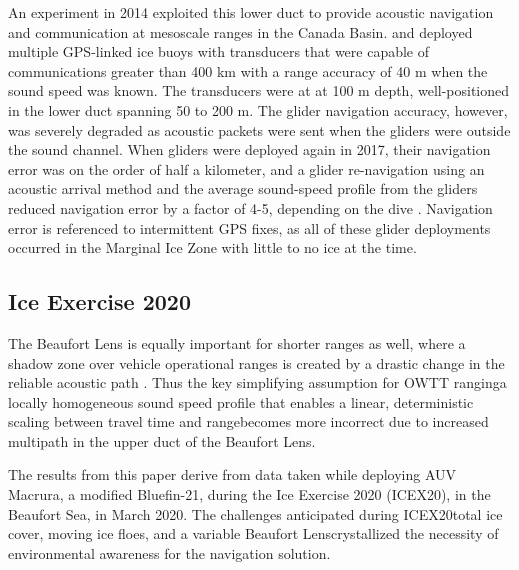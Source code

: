 An experiment in 2014 exploited this lower duct to provide acoustic navigation and communication at mesoscale ranges in the Canada Basin.
\citet{freitag_long_2015} and \citet{webster_towards_2015} deployed multiple GPS-linked ice buoys with transducers that were capable of communications greater than 400 km with a range accuracy of 40 m when the sound speed was known.
The transducers were at at 100 m depth, well-positioned in the lower duct spanning 50 to 200 m.
The glider navigation accuracy, however, was severely degraded as acoustic packets were sent when the gliders were outside the sound channel.
When gliders were deployed again in 2017, their navigation error was on the order of half a kilometer, and a glider re-navigation using an acoustic arrival method and the average sound-speed profile from the gliders reduced navigation error by a factor of 4-5, depending on the dive \citep{graupe_preliminary_2019}.
Navigation error is referenced to intermittent GPS fixes, as all of these glider deployments occurred in the Marginal Ice Zone with little to no ice at the time.

\subsection{Ice Exercise 2020}

The Beaufort Lens is equally important for shorter ranges as well, where a shadow zone over vehicle operational ranges is created by a drastic change in the reliable acoustic path \citep{schmidt_acoustic_2016}.
Thus the key simplifying assumption for OWTT ranging\textemdash a locally homogeneous sound speed profile that enables a linear, deterministic scaling between travel time and range\textemdash becomes more incorrect due to increased multipath in the upper duct of the Beaufort Lens.

The results from this paper derive from data taken while deploying AUV Macrura, a modified Bluefin-21, during the Ice Exercise 2020 (ICEX20), in the Beaufort Sea, in March 2020.
The challenges anticipated during ICEX20\textemdash total ice cover, moving ice floes, and a variable Beaufort Lens\textemdash crystallized the necessity of environmental awareness for the navigation solution.

